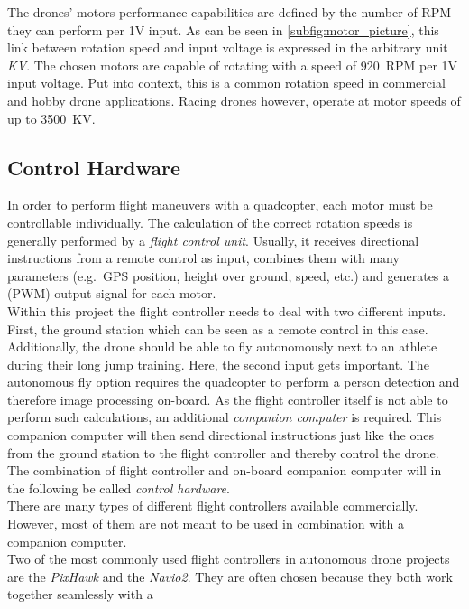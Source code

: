 \FloatBarrier
The drones' motors performance capabilities are defined by the number of 
\ac{RPM} they can perform per 1V input.
As can be seen in \autoref{subfig:motor_picture}, this link between 
rotation speed and input voltage is expressed in the arbitrary unit \textit{KV}.
The chosen motors are capable of rotating with a speed of 920~\ac{RPM} per 1V 
input voltage. 
Put into context, this is a common rotation speed in commercial and hobby 
drone applications.
Racing drones however, operate at motor speeds of up to 3500~KV.

\subsection*{Control Hardware}\label{subsec:4_control_hardware}
In order to perform flight maneuvers with a quadcopter, each motor must be
controllable individually.
The calculation of the correct rotation speeds is generally performed by 
a \textit{flight control unit}.
Usually, it receives directional instructions from a remote control as input,
combines them with many parameters (e.g.~\acs{GPS} position, height over ground,
speed, etc.) and generates a (\acs{PWM}) output signal for each motor.\\
Within this project the flight controller needs to deal with two different 
inputs.
First, the ground station which can be seen as a remote control in this case.
Additionally, the drone should be able to fly autonomously next to an athlete
during their long jump training.
Here, the second input gets important.
The autonomous fly option requires the quadcopter to perform a person 
detection and therefore image processing on-board.
As the flight controller itself is not able to perform such calculations, an
additional \textit{companion computer} is required.
This companion computer will then send directional instructions just like the 
ones from the ground station to the flight controller and thereby control the 
drone.\\
The combination of flight controller and on-board companion computer will in 
the following be called \textit{control hardware}.\\
There are many types of different flight controllers available commercially.
However, most of them are not meant to be used in combination with a companion
computer.\\
Two of the most commonly used flight controllers in autonomous drone projects
are the \textit{PixHawk} and the \textit{Navio2}.
They are often chosen because they both work together seamlessly with a 
